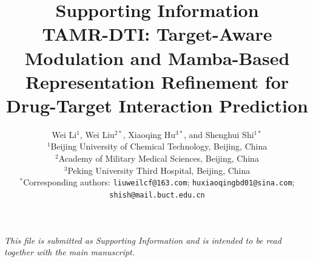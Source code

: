 \documentclass[11pt]{article}
\title{\textbf{Supporting Information}\\[4pt]
\large TAMR-DTI: Target-Aware Modulation and Mamba-Based Representation
Refinement for Drug-Target Interaction Prediction}
\author{Wei Li$^{1}$, Wei Liu$^{2*}$, Xiaoqing Hu$^{3*}$, and Shenghui Shi$^{1*}$\\[2pt]
\small $^{1}$Beijing University of Chemical Technology, Beijing, China\\
\small $^{2}$Academy of Military Medical Sciences, Beijing, China\\
\small $^{3}$Peking University Third Hospital, Beijing, China\\[2pt]
\small $^{*}$Corresponding authors: \texttt{liuweilcf@163.com};
\texttt{huxiaoqingbd01@sina.com}; \texttt{shish@mail.buct.edu.cn}}
\begin{document}
\maketitle

\begin{center}
\textit{This file is submitted as Supporting Information and is intended to be
read together with the main manuscript.}
\end{center}

\tableofcontents
\clearpage





\end{document}
